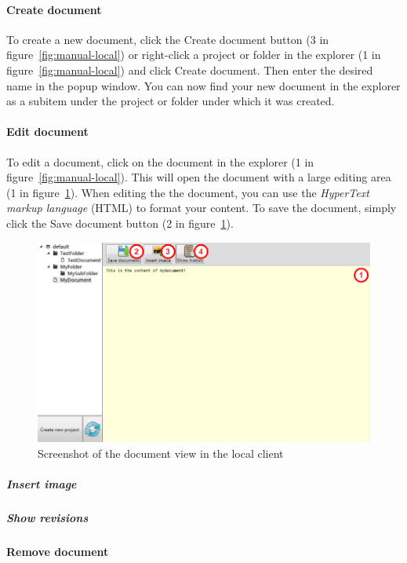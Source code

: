	\paragraph{Create document}
	To create a new document, click the Create document button (3 in figure~\ref{fig:manual-local}) or right-click a project or folder in the explorer (1 in figure~\ref{fig:manual-local}) and click Create document. Then enter the desired name in the popup window. You can now find your new document in the explorer as a subitem under the project or folder under which it was created.
	
	\paragraph{Edit document}
	To edit a document, click on the document in the explorer (1 in figure~\ref{fig:manual-local}). This will open the document with a large editing area (1 in figure~\ref{fig:manual-local-document}). When editing the the document, you can use the \emph{HyperText markup language}\cite{w3cHTML} (HTML) to format your content. To save the document, simply click the Save document button (2 in figure~\ref{fig:manual-local-document}).
	
	\begin{figure}[htb]
		\centering
		\includegraphics[width=1\textwidth]{User_manual/graphics/local-document.png}
		\caption{Screenshot of the document view in the local client}
		\label{fig:manual-local-document}
	\end{figure}
	
	
		\subparagraph{Insert image}
		
		
		\subparagraph{Show revisions}
		
	
	\paragraph{Remove document}
	